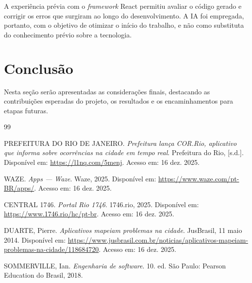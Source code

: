 \documentclass[12pt,a4paper]{article}
\begin{document}
A experiência prévia com o \textit{framework} React permitiu avaliar o código gerado e corrigir os erros que surgiram ao longo do desenvolvimento. A IA foi empregada, portanto, com o objetivo de otimizar o início do trabalho, e não como substituta do conhecimento prévio sobre a tecnologia.


\section{Conclusão}
Nesta seção serão apresentadas as considerações finais, destacando as contribuições
esperadas do projeto, os resultados e os encaminhamentos para etapas futuras.


\begin{thebibliography}{99}

PREFEITURA DO RIO DE JANEIRO.
\textit{Prefeitura lança COR.Rio, aplicativo que informa sobre ocorrências na cidade em tempo real}.
Prefeitura do Rio, [s.d.].
Disponível em: \url{https://l1nq.com/5menj}.
Acesso em: 16 dez. 2025.

WAZE.
\textit{Apps — Waze}.
Waze, 2025.
Disponível em: \url{https://www.waze.com/pt-BR/apps/}.
Acesso em: 16 dez. 2025.

CENTRAL 1746.
\textit{Portal Rio 1746}.
1746.rio, 2025.
Disponível em: \url{https://www.1746.rio/hc/pt-br}.
Acesso em: 16 dez. 2025.

DUARTE, Pierre.
\textit{Aplicativos mapeiam problemas na cidade}.
JusBrasil, 11 maio 2014.
Disponível em: \url{https://www.jusbrasil.com.br/noticias/aplicativos-mapeiam-problemas-na-cidade/118684720}.
Acesso em: 16 dez. 2025.

SOMMERVILLE, Ian.
\textit{Engenharia de software}.
10. ed. São Paulo: Pearson Education do Brasil, 2018.

\end{thebibliography}
\end{document}
